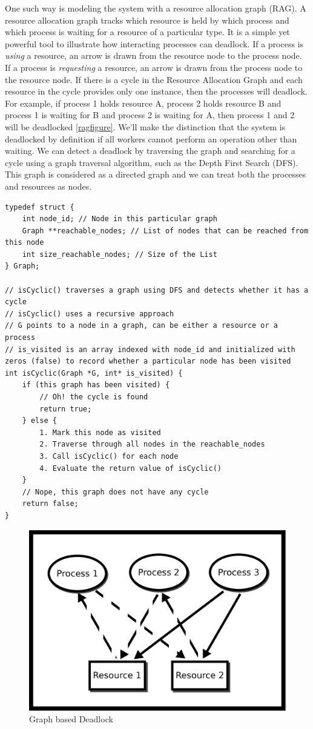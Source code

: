 One such way is modeling the system with a resource allocation graph (\gls{RAG}).
A resource allocation graph tracks which resource is held by which process and which process is waiting for a resource of a particular type.
It is a simple yet powerful tool to illustrate how interacting processes can deadlock.
If a process is \emph{using} a resource, an arrow is drawn from the resource node to the process node.
If a process is \emph{requesting} a resource, an arrow is drawn from the process node to the resource node.
If there is a cycle in the Resource Allocation Graph and each resource in the cycle provides only one instance, then the processes will deadlock.
For example, if process 1 holds resource A, process 2 holds resource B and process 1 is waiting for B and process 2 is waiting for A, then process 1 and 2 will be deadlocked \ref{ragfigure}.
We'll make the distinction that the system is deadlocked by definition if all workers cannot perform an operation other than waiting.
We can detect a deadlock by traversing the graph and searching for a cycle using a graph traversal algorithm, such as the Depth First Search (DFS).
This graph is considered as a directed graph and we can treat both the processes and resources as nodes.

\begin{verbatim}
typedef struct {
	int node_id; // Node in this particular graph
	Graph **reachable_nodes; // List of nodes that can be reached from this node
	int size_reachable_nodes; // Size of the List
} Graph;

// isCyclic() traverses a graph using DFS and detects whether it has a cycle
// isCyclic() uses a recursive approach
// G points to a node in a graph, can be either a resource or a process
// is_visited is an array indexed with node_id and initialized with zeros (false) to record whether a particular node has been visited
int isCyclic(Graph *G, int* is_visited) {
	if (this graph has been visited) {
		// Oh! the cycle is found
		return true;
	} else {
		1. Mark this node as visited
		2. Traverse through all nodes in the reachable_nodes
		3. Call isCyclic() for each node
		4. Evaluate the return value of isCyclic()
	}
	// Nope, this graph does not have any cycle
	return false;
}
\end{verbatim}

\begin{figure}[H]
\centering
\includegraphics[width=.5\textwidth]{deadlock/drawings/deadlock.eps}
\caption{Graph based Deadlock}
\end{figure}

